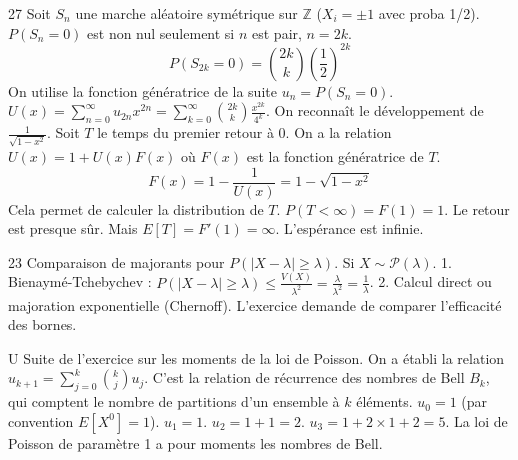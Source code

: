 \begin{correction}{27}
Soit $S_n$ une marche aléatoire symétrique sur $\mathbb{Z}$ ($X_i = \pm 1$ avec proba 1/2).
$P(S_n = 0)$ est non nul seulement si $n$ est pair, $n=2k$.
$$ P(S_{2k} = 0) = \binom{2k}{k} \left(\frac{1}{2}\right)^{2k} $$
On utilise la fonction génératrice de la suite $u_n = P(S_n=0)$.
$U(x) = \sum_{n=0}^\infty u_{2n} x^{2n} = \sum_{k=0}^\infty \binom{2k}{k} \frac{x^{2k}}{4^k}$.
On reconnaît le développement de $\frac{1}{\sqrt{1-x^2}}$.
Soit $T$ le temps du premier retour à 0.
On a la relation $U(x) = 1 + U(x) F(x)$ où $F(x)$ est la fonction génératrice de $T$.
$$ F(x) = 1 - \frac{1}{U(x)} = 1 - \sqrt{1-x^2} $$
Cela permet de calculer la distribution de $T$.
$P(T < \infty) = F(1) = 1$. Le retour est presque sûr.
Mais $E[T] = F'(1) = \infty$. L'espérance est infinie.
\end{correction}

\begin{correction}{23}
Comparaison de majorants pour $P(|X-\lambda| \ge \lambda)$.
Si $X \sim \mathcal{P}(\lambda)$.
1. Bienaymé-Tchebychev : $P(|X-\lambda| \ge \lambda) \le \frac{V(X)}{\lambda^2} = \frac{\lambda}{\lambda^2} = \frac{1}{\lambda}$.
2. Calcul direct ou majoration exponentielle (Chernoff).
L'exercice demande de comparer l'efficacité des bornes.
\end{correction}

\begin{correction}{U}
Suite de l'exercice sur les moments de la loi de Poisson.
On a établi la relation $u_{k+1} = \sum_{j=0}^k \binom{k}{j} u_j$.
C'est la relation de récurrence des nombres de Bell $B_k$, qui comptent le nombre de partitions d'un ensemble à $k$ éléments.
$u_0 = 1$ (par convention $E[X^0]=1$).
$u_1 = 1$.
$u_2 = 1 + 1 = 2$.
$u_3 = 1 + 2\times 1 + 2 = 5$.
La loi de Poisson de paramètre 1 a pour moments les nombres de Bell.
\end{correction}

